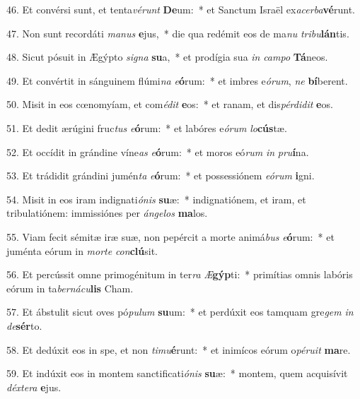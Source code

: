 46. Et convérsi sunt, et tenta\textit{vé}\textit{runt} \textbf{De}um:~*  et Sanctum Israël ex\textit{a}\textit{cer}\textit{ba}\textbf{vé}runt.\

47. Non sunt recordáti \textit{ma}\textit{nus} \textbf{e}jus,~*  die qua redémit eos de ma\textit{nu} \textit{tri}\textit{bu}\textbf{lán}tis.\

48. Sicut pósuit in Ægýpto \textit{si}\textit{gna} \textbf{su}a,~*  et prodígia sua \textit{in} \textit{cam}\textit{po} \textbf{Tá}neos.\

49. Et convértit in sánguinem flúmi\textit{na} \textit{e}\textbf{ó}rum:~*  et imbres e\textit{ó}\textit{rum}, \textit{ne} \textbf{bí}berent.\

50. Misit in eos cœnomyíam, et com\textit{é}\textit{dit} \textbf{e}os:~*  et ranam, et dis\textit{pér}\textit{di}\textit{dit} \textbf{e}os.\

51. Et dedit ærúgini fruc\textit{tus} \textit{e}\textbf{ó}rum:~*  et labóres e\textit{ó}\textit{rum} \textit{lo}\textbf{cús}tæ.\

52. Et occídit in grándine víne\textit{as} \textit{e}\textbf{ó}rum:~*  et moros eó\textit{rum} \textit{in} \textit{pru}\textbf{í}na.\

53. Et trádidit grándini jumén\textit{ta} \textit{e}\textbf{ó}rum:~*  et possessiónem \textit{e}\textit{ó}\textit{rum} \textbf{i}gni.\

54. Misit in eos iram indignati\textit{ó}\textit{nis} \textbf{su}æ:~*  indignatiónem, et iram, et tribulatiónem: immissiónes per \textit{án}\textit{ge}\textit{los} \textbf{ma}los.\

55. Viam fecit sémitæ iræ suæ, non pepércit a morte animá\textit{bus} \textit{e}\textbf{ó}rum:~*  et juménta eórum in \textit{mor}\textit{te} \textit{con}\textbf{clú}sit.\

56. Et percússit omne primogénitum in ter\textit{ra} \textit{Æ}\textbf{gýp}ti:~*  primítias omnis labóris eórum in ta\textit{ber}\textit{ná}\textit{cu}\textbf{lis} Cham.\

57. Et ábstulit sicut oves pó\textit{pu}\textit{lum} \textbf{su}um:~*  et perdúxit eos tamquam gre\textit{gem} \textit{in} \textit{de}\textbf{sér}to.\

58. Et dedúxit eos in spe, et non \textit{ti}\textit{mu}\textbf{é}runt:~*  et inimícos eórum o\textit{pé}\textit{ru}\textit{it} \textbf{ma}re.\

59. Et indúxit eos in montem sanctificati\textit{ó}\textit{nis} \textbf{su}æ:~*  montem, quem acquisívit \textit{déx}\textit{te}\textit{ra} \textbf{e}jus.\

